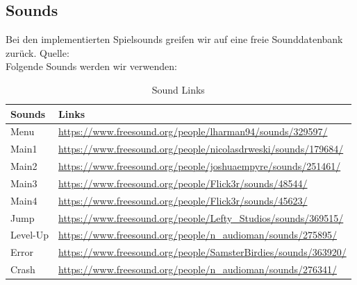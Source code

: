 \subsection{Sounds}
Bei den implementierten Spielsounds greifen wir auf eine freie Sounddatenbank zurück. Quelle: \cite{sounds}\\
Folgende Sounds werden wir verwenden:
\begin{table}[h]
	\centering
	\begin{tabular}{|l|l|}
		\toprule
		\textbf{Sounds}& \textbf{Links}\\
		\midrule
		Menu & \url{https://www.freesound.org/people/lharman94/sounds/329597/}\\ 
		Main1 & \url{https://www.freesound.org/people/nicolasdrweski/sounds/179684/}\\
		Main2  & \url{https://www.freesound.org/people/joshuaempyre/sounds/251461/}\\ 
		Main3  & \url{https://www.freesound.org/people/Flick3r/sounds/48544/}\\
		Main4 & \url{https://www.freesound.org/people/Flick3r/sounds/45623/}\\
		Jump & \url{https://www.freesound.org/people/Lefty_Studios/sounds/369515/}\\
		Level-Up & \url{https://www.freesound.org/people/n_audioman/sounds/275895/}\\
		Error & \url{https://www.freesound.org/people/SamsterBirdies/sounds/363920/}\\
		Crash & \url{https://www.freesound.org/people/n_audioman/sounds/276341/}\\
		\bottomrule
	\end{tabular}
	\caption{Sound Links}
\end{table}

